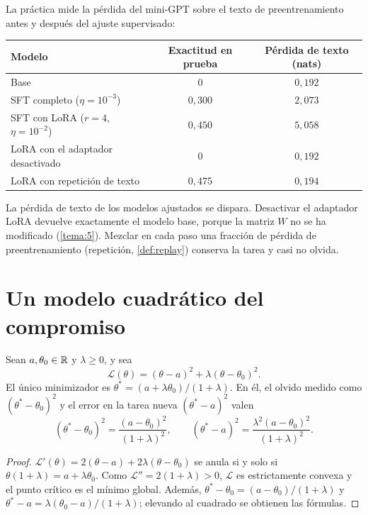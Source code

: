 \begin{ejemplo}\label{ej:olvido-practica}
La práctica mide la pérdida del mini-GPT sobre el texto de preentrenamiento antes y después del ajuste supervisado:
\begin{center}\small
\begin{tabular}{@{}lcc@{}}
\toprule
Modelo & Exactitud en prueba & Pérdida de texto (nats) \\
\midrule
Base & $0$ & $0{,}192$ \\
SFT completo ($\eta=10^{-3}$) & $0{,}300$ & $2{,}073$ \\
SFT con LoRA ($r=4$, $\eta=10^{-2}$) & $0{,}450$ & $5{,}058$ \\
LoRA con el adaptador desactivado & $0$ & $0{,}192$ \\
LoRA con repetición de texto & $0{,}475$ & $0{,}194$ \\
\bottomrule
\end{tabular}
\end{center}
La pérdida de texto de los modelos ajustados se dispara. Desactivar el adaptador LoRA devuelve exactamente el modelo base, porque la matriz $W$ no se ha modificado (\cref{tema:5}). Mezclar en cada paso una fracción de pérdida de preentrenamiento (repetición, \cref{def:replay}) conserva la tarea y casi no olvida.
\end{ejemplo}

\section{Un modelo cuadrático del compromiso}

\begin{proposicion}\label{prop:muelle}
Sean $a,\theta_0\in\mathbb{R}$ y $\lambda\ge 0$, y sea
\[
\mathcal{L}(\theta)=(\theta-a)^{2}+\lambda(\theta-\theta_0)^{2}.
\]
El único minimizador es $\theta^{\ast}=(a+\lambda\theta_0)/(1+\lambda)$. En él, el olvido medido como $(\theta^{\ast}-\theta_0)^{2}$ y el error en la tarea nueva $(\theta^{\ast}-a)^{2}$ valen
\[
(\theta^{\ast}-\theta_0)^{2}=\frac{(a-\theta_0)^{2}}{(1+\lambda)^{2}},\qquad (\theta^{\ast}-a)^{2}=\frac{\lambda^{2}(a-\theta_0)^{2}}{(1+\lambda)^{2}}.
\]
\end{proposicion}

\begin{proof}
$\mathcal{L}'(\theta)=2(\theta-a)+2\lambda(\theta-\theta_0)$ se anula si y solo si $\theta(1+\lambda)=a+\lambda\theta_0$. Como $\mathcal{L}''=2(1+\lambda)>0$, $\mathcal{L}$ es estrictamente convexa y el punto crítico es el mínimo global. Además, $\theta^{\ast}-\theta_0=(a-\theta_0)/(1+\lambda)$ y $\theta^{\ast}-a=\lambda(\theta_0-a)/(1+\lambda)$; elevando al cuadrado se obtienen las fórmulas.
\end{proof}

